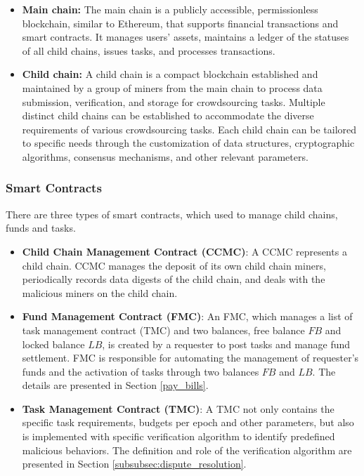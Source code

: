 \documentclass[10pt,journal]{IEEEtran}
\begin{document}
\begin{itemize}
    \item \textbf{Main chain:}
    The main chain is a publicly accessible, permissionless blockchain, similar to Ethereum, that supports financial transactions and smart contracts. It manages users' assets, maintains a ledger of the statuses of all child chains, issues tasks, and processes transactions.

    \item \textbf{Child chain:}
    A child chain is a compact blockchain established and maintained by a group of miners from the main chain to process data submission, verification, and storage for crowdsourcing tasks. Multiple distinct child chains can be established to accommodate the diverse requirements of various crowdsourcing tasks. Each child chain can be tailored to specific needs through the customization of data structures, cryptographic algorithms, consensus mechanisms, and other relevant parameters.

\end{itemize}


\subsubsection{\textbf{Smart Contracts}}\label{subsub:smartcontract}
There are three types of smart contracts, which used to manage child chains, funds and tasks.
\begin{itemize}
    \item \textbf{Child Chain Management Contract (CCMC)}:
    A CCMC represents a child chain. CCMC manages the deposit of its own child chain miners, periodically records data digests of the child chain, and deals with the malicious miners on the child chain.

    \item \textbf{Fund Management Contract (FMC)}: An FMC, which manages a list of task management contract (TMC) and two balances, free balance $FB$ and locked balance $LB$, is created by a requester to post tasks and manage fund settlement. FMC is responsible for automating the management of requester's funds and the activation of tasks through two balances $FB$ and $LB$. The details are presented in Section \ref{pay_bills}.
    \item \textbf{Task Management Contract (TMC)}: A TMC not only contains the specific task requirements, budgets per epoch and other parameters, but also is implemented with specific verification algorithm to identify predefined malicious behaviors. The definition and role of the verification algorithm are presented in Section \ref{subsubsec:dispute_resolution}.
\end{itemize}
\end{document}
